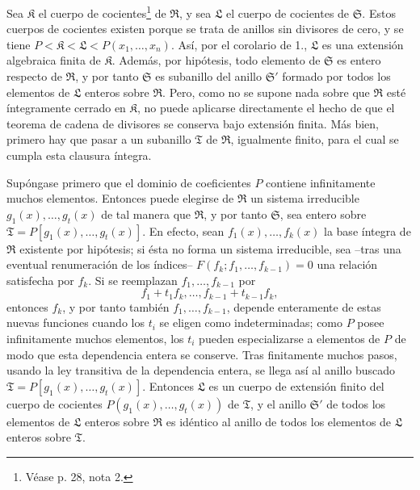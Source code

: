 \documentclass[11pt]{article}
\begin{document}
Sea $\mathfrak K$ el cuerpo de cocientes\footnote{Véase p. 28, nota 2.} de $\mathfrak R$, y sea $\mathfrak L$ el cuerpo de cocientes de $\mathfrak S$. Estos cuerpos de cocientes existen porque se trata de anillos sin divisores de cero, y se tiene $P<\mathfrak K<\mathfrak L<P(x_1,\ldots,x_n)$. Así, por el corolario de 1., $\mathfrak L$ es una extensión algebraica finita de $\mathfrak K$. Además, por hipótesis, todo elemento de $\mathfrak S$ es entero respecto de $\mathfrak R$, y por tanto $\mathfrak S$ es subanillo del anillo $\mathfrak S'$ formado por todos los elementos de $\mathfrak L$ enteros sobre $\mathfrak R$. Pero, como no se supone nada sobre que $\mathfrak R$ esté íntegramente cerrado en $\mathfrak K$, no puede aplicarse directamente el hecho de que el teorema de cadena de divisores se conserva bajo extensión finita. Más bien, primero hay que pasar a un subanillo $\mathfrak T$ de $\mathfrak R$, igualmente finito, para el cual se cumpla esta clausura íntegra.

Supóngase primero que el dominio de coeficientes $P$ contiene infinitamente muchos elementos. Entonces puede elegirse de $\mathfrak R$ un sistema irreducible $g_1(x),\ldots,g_t(x)$ de tal manera que $\mathfrak R$, y por tanto $\mathfrak S$, sea entero sobre $\mathfrak T=P[g_1(x),\ldots,g_t(x)]$. En efecto, sean $f_1(x),\ldots,f_k(x)$ la base íntegra de $\mathfrak R$ existente por hipótesis; si ésta no forma un sistema irreducible, sea --tras una eventual renumeración de los índices-- $F(f_k;f_1,\ldots,f_{k-1})=0$ una relación satisfecha por $f_k$. Si se reemplazan $f_1,\ldots,f_{k-1}$ por
\[
 f_1+t_1f_k,\ldots,f_{k-1}+t_{k-1}f_k,
\]
entonces $f_k$, y por tanto también $f_1,\ldots,f_{k-1}$, depende enteramente de estas nuevas funciones cuando los $t_i$ se eligen como indeterminadas; como $P$ posee infinitamente muchos elementos, los $t_i$ pueden especializarse a elementos de $P$ de modo que esta dependencia entera se conserve. Tras finitamente muchos pasos, usando la ley transitiva de la dependencia entera, se llega así al anillo buscado $\mathfrak T=P[g_1(x),\ldots,g_t(x)]$. Entonces $\mathfrak L$ es un cuerpo de extensión finito del cuerpo de cocientes $P(g_1(x),\ldots,g_t(x))$ de $\mathfrak T$, y el anillo $\mathfrak S'$ de todos los elementos de $\mathfrak L$ enteros sobre $\mathfrak R$ es idéntico al anillo de todos los elementos de $\mathfrak L$ enteros sobre $\mathfrak T$.
\end{document}
